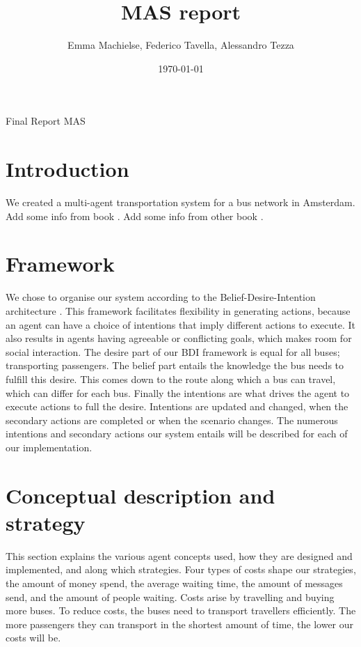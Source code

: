 \documentclass{article}
\title{MAS report}
\author{Emma Machielse, Federico Tavella, Alessandro Tezza}
\date{\today}
\begin{document}
\maketitle Final Report MAS


\section{Introduction}
We created a multi-agent transportation system for a bus network in Amsterdam. 
Add some info from book \cite{multiagentsystems}.
Add some info from other book \cite{intromultiagentsystems}.

\section{Framework}
We chose to organise our system according to the Belief-Desire-Intention architecture \cite{caillou2017simple}. This framework facilitates flexibility in generating actions, because an agent can have a choice of intentions that imply different actions to execute. It also results in agents having agreeable or conflicting goals, which makes room for social interaction. 
\newline
The desire part of our BDI framework is equal for all buses; transporting passengers. The belief part entails the knowledge the bus needs to fulfill this desire. This comes down to the route along which a bus can travel, which can differ for each bus. Finally the intentions are what drives the agent to execute actions to full the desire. Intentions are updated and changed, when the secondary actions are completed or when the scenario changes. The numerous intentions and secondary actions our system entails will be described for each of our implementation.

\section{Conceptual description and strategy}
This section explains the various agent concepts used, how they are designed and implemented, and along which strategies. Four types of costs shape our strategies, the amount of money spend, the average waiting time, the amount of messages send, and the amount of people waiting. Costs arise by travelling and buying more buses. To reduce costs, the buses need to transport travellers efficiently. The more passengers they can transport in the shortest amount of time, the lower our costs will be.
\end{document}
